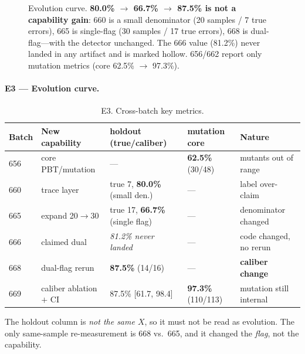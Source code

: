 \documentclass{article}
\begin{document}
\begin{figure}[t]
\centering
{}
\caption{Evolution curve. \textbf{80.0\% $\to$ 66.7\% $\to$ 87.5\% is not a capability gain}:
660 is a small denominator (20 samples / 7 true errors), 665 is single-flag (30 samples / 17 true
errors), 668 is dual-flag---with the detector unchanged. The 666 value (81.2\%) never landed in
any artifact and is marked hollow. 656/662 report only mutation metrics (core 62.5\% $\to$ 97.3\%).}
\label{fig:evolution}
\end{figure}

\paragraph{E3 --- Evolution curve.}
\begin{table}[t]
\caption{E3. Cross-batch key metrics.}
\label{tab:e3}
\centering
\small
\begin{tabular}{@{}llp{3.0cm}lp{3.0cm}@{}}
\toprule
Batch & New capability & holdout (true/caliber) & mutation core & Nature \\
\midrule
656 & core PBT/mutation & --- & \textbf{62.5\%} (30/48) & mutants out of range \\
660 & trace layer & true 7, \textbf{80.0\%} (small den.) & --- & label over-claim \\
665 & expand 20$\to$30 & true 17, \textbf{66.7\%} (single flag) & --- & denominator changed \\
666 & claimed dual & \textit{81.2\% never landed} & --- & code changed, no rerun \\
668 & dual-flag rerun & \textbf{87.5\%} (14/16) & --- & \textbf{caliber change} \\
669 & caliber ablation $+$ CI & 87.5\% [61.7, 98.4] & \textbf{97.3\%} (110/113) & mutation still internal \\
\bottomrule
\end{tabular}
\end{table}
The holdout column is \emph{not the same $X$}, so it must not be read as evolution. The only
same-sample re-measurement is 668 vs.\ 665, and it changed the \emph{flag}, not the capability.
\end{document}
